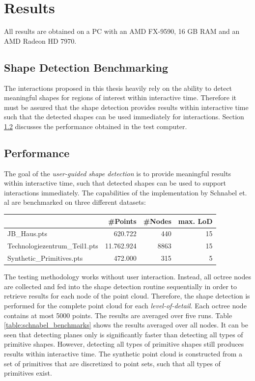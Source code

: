 \chapter{Results}
\label{chap:results}


All results are obtained on a PC with an AMD FX-9590, 16 GB RAM and an AMD Radeon HD 7970. 


\section{Shape Detection Benchmarking}

The interactions proposed in this thesis heavily rely on the ability to detect meaningful shapes for regions of interest within interactive time. Therefore it must be assured that the shape detection provides results within interactive time such that the detected shapes can be used immediately for interactions. Section \ref{sec:shapedetectionperformance} discusses the performance obtained in the test computer. 


\section{Performance}
\label{sec:shapedetectionperformance}

The goal of the \textit{user-guided shape detection} is to provide meaningful results within interactive time, such that detected shapes can be used to support interactions immediately. The capabilities of the implementation by Schnabel et. al\cite{schnabel-2007-software} are benchmarked on three different datasets: 

\begin{center}
\begin{tabular}{ l | r | r | r }
																& \textbf{\#Points} 			& \textbf{\#Nodes} & \textbf{max. LoD} \\
	\hline
  JB\_Haus.pts									& 620.722 								& 440 			& 15 \\
  Technologiezentrum\_Teil1.pts	& 11.762.924							& 8863 			& 15 \\
  Synthetic\_Primitives.pts 		& 472.000 								& 315	 			& 5 \\
	
\end{tabular}
\end{center}

The testing methodology works without user interaction. Instead, all octree nodes are collected and fed into the shape detection routine sequentially in order to retrieve results for each node of the point cloud. Therefore, the shape detection is performed for the complete point cloud for each \textit{level-of-detail}. Each octree node contains at most 5000 points. The results are averaged over five runs. Table \ref{table:schnabel_benchmarks} shows the results averaged over all nodes. It can be seen that detecting planes only is significantly faster than detecting all types of primitive shapes. However, detecting all types of primitive shapes still produces results within interactive time. The synthetic point cloud is constructed from a set of primitives that are discretized to point sets, such that all types of primitives exist. 

